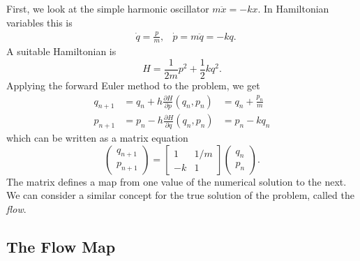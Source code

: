 \documentclass{report}
\theoremstyle{exampstyle} \newtheorem{example}[theorem]{Example}
\theoremstyle{exampstyle} \newtheorem{remark}[theorem]{Remark}
\theoremstyle{exampstyle} \newtheorem{definition}[theorem]{Definition}
\theoremstyle{exampstyle} \newtheorem{lemma}[theorem]{Lemma}
\theoremstyle{exampstyle} \newtheorem{proposition}[theorem]{Proposition}
\begin{document}
First, we look at the simple harmonic oscillator $m \ddot{x} = -k x$.
In Hamiltonian variables this is
\begin{equation*}
	\begin{aligned}
		&\dot{q} = \frac{p}{m}, &\dot{p} = m\ddot{q} = -kq.
	\end{aligned}
\end{equation*}
A suitable Hamiltonian is
\begin{equation*}
	H = \frac{1}{2m}p^2 + \frac{1}{2}kq^2.
\end{equation*}
Applying the forward Euler method to the problem, we get
\begin{equation*}
	\begin{aligned}
		q_{n+1} &= q_n + h\frac{\partial H}{\partial p}(q_n, p_n) &= q_n + \frac{p_n}{m}\\
		p_{n+1} &= p_n - h\frac{\partial H}{\partial q}(q_n, p_n) &= p_n - kq_n
	\end{aligned}
\end{equation*}
which can be written as a matrix equation
\begin{equation*}
	\begin{pmatrix}
		q_{n+1} \\
		p_{n+1}
	\end{pmatrix} = \begin{bmatrix}
		1 & 1/m \\
		-k & 1
	\end{bmatrix} \begin{pmatrix}
		q_n \\
		p_n
	\end{pmatrix}.
\end{equation*}
The matrix defines a map from one value of the numerical solution to the next.
We can consider a similar concept for the true solution of the problem, called the \textit{flow}.

\subsection{The Flow Map}
\end{document}
